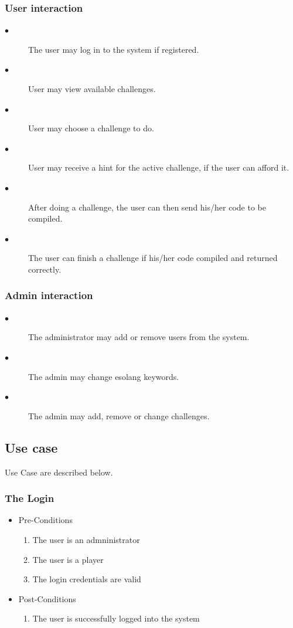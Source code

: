 \documentclass[english]{article}
\begin{document}
		\subsubsection{User interaction}
		\begin{description}
			\item[$\bullet$] The user may log in to the system if registered.   
			\item[$\bullet$] User may view available challenges.
			\item[$\bullet$] User may choose a challenge to do.
			\item[$\bullet$] User may receive a hint for the active challenge, if the user can afford it.
			\item[$\bullet$] After doing a challenge, the user can then send his/her code to be compiled.
			\item[$\bullet$] The user can finish a challenge if his/her code compiled and returned correctly.
		\end{description}
		
		\subsubsection{Admin interaction}
		\begin{description}
			\item[$\bullet$] The administrator may add or remove users from the system.
			\item[$\bullet$] The admin may change esolang keywords.
			\item[$\bullet$] The admin may add, remove or change challenges.
		\end{description}

		
		\subsection{Use case}
		Use Case are described below.
		
		
		
		\subsubsection{The Login}
		\begin{itemize}
	
		
		\item Pre-Conditions
			\begin{enumerate}
				\item The user is an admninistrator
				\item The user is a player
				\item The login credentials are valid
			\end{enumerate}
		\item Post-Conditions
			\begin{enumerate}
			\item The user is successfully logged into the system
						
			\end{enumerate}
		
			
		

\end{itemize}
\end{document}
